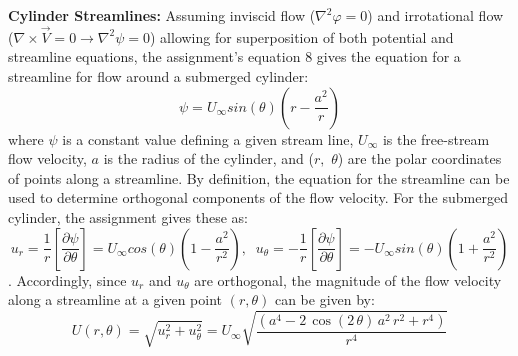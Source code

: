 \documentclass[12pt]{article}
\begin{document}
	\hfill\break\break
	\textbf{Cylinder Streamlines:}
	Assuming inviscid flow ($\nabla^{2}\varphi=0$) and irrotational flow ($\nabla\times\vec{V}=0 \rightarrow \nabla^{2}\psi=0$) allowing for superposition of both potential and streamline equations, the assignment's equation 8 gives the equation for a streamline for flow around a submerged cylinder:
	$$ \psi = U_{\infty}sin(\theta)\left(r-\frac{a^{2}}{r}\right)$$
	where $\psi$ is a constant value defining a given stream line, $U_{\infty}$ is the free-stream flow velocity, $a$ is the radius of the cylinder, and ($r,$ $\theta$) are the polar coordinates of points along a streamline.
	\hfill\break\break
	By definition, the equation for the streamline can be used to determine orthogonal components of the flow velocity. For the submerged cylinder, the assignment gives these as:
	$$u_{r}=\frac{1}{r}\left[\frac{\partial\psi}{\partial\theta}\right]=U_{\infty}cos(\theta)\left(1-\frac{a^2}{r^2}\right),
	\;\;u_{\theta}=-\frac{1}{r}\left[\frac{\partial\psi}{\partial\theta}\right]=-U_{\infty}sin(\theta)\left(1+\frac{a^2}{r^2}\right)$$.
	\hfill\break
	Accordingly, since $u_r$ and $u_\theta$ are orthogonal, the magnitude of the flow velocity along a streamline at a given point $(r,\theta)$ can be given by:
	$$U(r,\theta)=\sqrt{u_r^2+u_\theta^2}=U_\infty\sqrt{\frac{\left(a^4-2\,\cos\left(2\,\theta\right)\,a^2\,r^2+r^4\right)}{r^4}}$$
\end{document}
